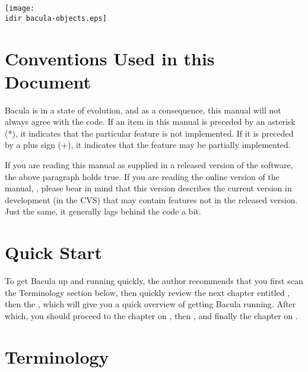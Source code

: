 \texttt{[image: \\idir bacula-objects.eps]} 

\section{Conventions Used in this Document}

Bacula is in a state of evolution, and as a consequence, this manual
will not always agree with the code. If an item in this manual is preceded by
an asterisk (*), it indicates that the particular feature is not implemented.
If it is preceded by a plus sign (+), it indicates that the feature may be
partially implemented. 

If you are reading this manual as supplied in a released version of the
software, the above paragraph holds true. If you are reading the online
version of the manual, 
, please bear in
mind that this version describes the current version in development (in the
CVS) that may contain features not in the released version. Just the same, it
generally lags behind the code a bit. 

\section{Quick Start}

To get Bacula up and running quickly, the author recommends
that you first scan the
Terminology section below, then quickly review the next chapter entitled 
, then the 
, which will
give you a quick overview of getting Bacula running. After which, you should
proceed to the chapter on 
, then 
, and finally the
chapter on 
. 

\section{Terminology}

